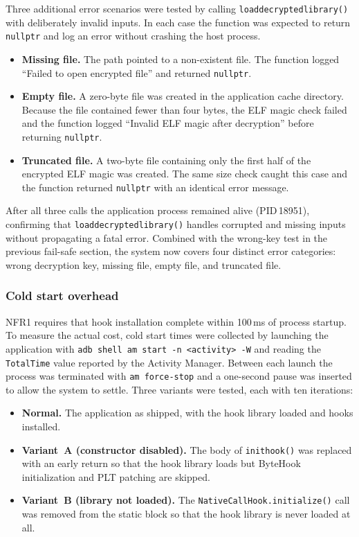 \documentclass[11pt,a4paper]{report}
\renewcommand\_{{\textunderscore\allowbreak}}
\begin{document}
Three additional error scenarios were tested by calling \texttt{load\_decrypted\_library()} with deliberately invalid inputs. In each case the function was expected to return \texttt{nullptr} and log an error without crashing the host process.

\begin{itemize}
    \item \textbf{Missing file.} The path pointed to a non-existent file. The function logged ``Failed to open encrypted file'' and returned \texttt{nullptr}.
    \item \textbf{Empty file.} A zero-byte file was created in the application cache directory. Because the file contained fewer than four bytes, the ELF magic check failed and the function logged ``Invalid ELF magic after decryption'' before returning \texttt{nullptr}.
    \item \textbf{Truncated file.} A two-byte file containing only the first half of the encrypted ELF magic was created. The same size check caught this case and the function returned \texttt{nullptr} with an identical error message.
\end{itemize}

After all three calls the application process remained alive (PID\,18951), confirming that \texttt{load\_decrypted\_library()} handles corrupted and missing inputs without propagating a fatal error. Combined with the wrong-key test in the previous fail-safe section, the system now covers four distinct error categories: wrong decryption key, missing file, empty file, and truncated file.

\subsubsection{Cold start overhead}

NFR1 requires that hook installation complete within 100\,ms of process startup. To measure the actual cost, cold start times were collected by launching the application with \texttt{adb shell am start -n <activity> -W} and reading the \texttt{TotalTime} value reported by the Activity Manager. Between each launch the process was terminated with \texttt{am force-stop} and a one-second pause was inserted to allow the system to settle. Three variants were tested, each with ten iterations:

\begin{itemize}
    \item \textbf{Normal.} The application as shipped, with the hook library loaded and hooks installed.
    \item \textbf{Variant~A (constructor disabled).} The body of \texttt{init\_hook()} was replaced with an early return so that the hook library loads but ByteHook initialization and PLT patching are skipped.
    \item \textbf{Variant~B (library not loaded).} The \texttt{NativeCallHook.\allowbreak initialize()} call was removed from the static block so that the hook library is never loaded at all.
\end{itemize}
\end{document}
